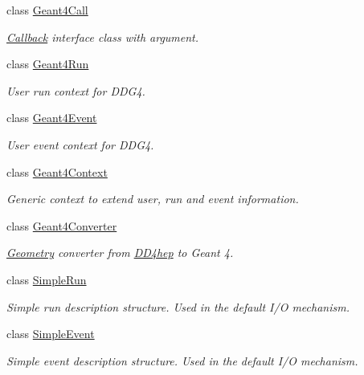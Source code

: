 \begin{DoxyCompactItemize}
class \hyperlink{class_d_d4hep_1_1_simulation_1_1_geant4_call}{Geant4Call}
\begin{DoxyCompactList}\small\item\em \hyperlink{class_d_d4hep_1_1_callback}{Callback} interface class with argument. \item\end{DoxyCompactList}\item 
class \hyperlink{class_d_d4hep_1_1_simulation_1_1_geant4_run}{Geant4Run}
\begin{DoxyCompactList}\small\item\em User run context for DDG4. \item\end{DoxyCompactList}\item 
class \hyperlink{class_d_d4hep_1_1_simulation_1_1_geant4_event}{Geant4Event}
\begin{DoxyCompactList}\small\item\em User event context for DDG4. \item\end{DoxyCompactList}\item 
class \hyperlink{class_d_d4hep_1_1_simulation_1_1_geant4_context}{Geant4Context}
\begin{DoxyCompactList}\small\item\em Generic context to extend user, run and event information. \item\end{DoxyCompactList}\item 
class \hyperlink{class_d_d4hep_1_1_simulation_1_1_geant4_converter}{Geant4Converter}
\begin{DoxyCompactList}\small\item\em \hyperlink{namespace_d_d4hep_1_1_geometry}{Geometry} converter from \hyperlink{namespace_d_d4hep}{DD4hep} to Geant 4. \item\end{DoxyCompactList}\item 
class \hyperlink{class_d_d4hep_1_1_simulation_1_1_simple_run}{SimpleRun}
\begin{DoxyCompactList}\small\item\em Simple run description structure. Used in the default I/O mechanism. \item\end{DoxyCompactList}\item 
class \hyperlink{class_d_d4hep_1_1_simulation_1_1_simple_event}{SimpleEvent}
\begin{DoxyCompactList}\small\item\em Simple event description structure. Used in the default I/O mechanism. \item\end{DoxyCompactList}\item 

\end{DoxyCompactItemize}
